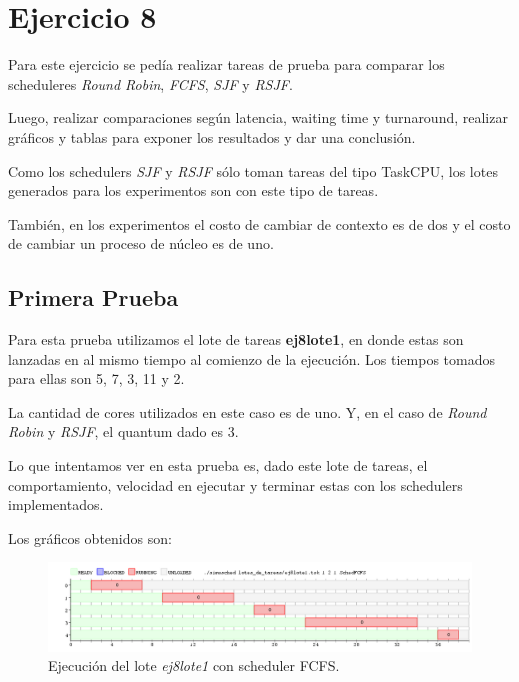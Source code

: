 \section{Ejercicio 8}

Para este ejercicio se pedía realizar tareas de prueba para comparar los scheduleres \emph{Round Robin}, \emph{FCFS}, \emph{SJF} y \emph{RSJF}.

Luego, realizar comparaciones según latencia, waiting time y turnaround, realizar gráficos y tablas para exponer los resultados y dar una conclusión.

Como los schedulers \emph{SJF} y \emph{RSJF} sólo toman tareas del tipo TaskCPU, los lotes generados para los experimentos son con este tipo de tareas.

También, en los experimentos el costo de cambiar de contexto es de dos y el costo de cambiar un proceso de núcleo es de uno.

\subsection{Primera Prueba}

Para esta prueba utilizamos el lote de tareas \textbf{ej8lote1}, en donde estas son lanzadas en al mismo tiempo al comienzo de la ejecución. Los tiempos tomados para ellas son 5, 7, 3, 11 y 2.

La cantidad de cores utilizados en este caso es de uno. Y, en el caso de \emph{Round Robin} y \emph{RSJF}, el quantum dado es 3.

Lo que intentamos ver en esta prueba es, dado este lote de tareas, el comportamiento, velocidad en ejecutar y terminar estas con los schedulers implementados.

Los gráficos obtenidos son:

\begin{figure}[!h]
	\begin{center}
		\includegraphics[width=500px]{imagenes/ej8_prueba1_fcfs.png}
		\caption{Ejecución del lote \emph{ej8lote1} con scheduler FCFS.}
		\label{fig:grafico_ej8_prueba1_fcfs}
	\end{center}
\end{figure}

